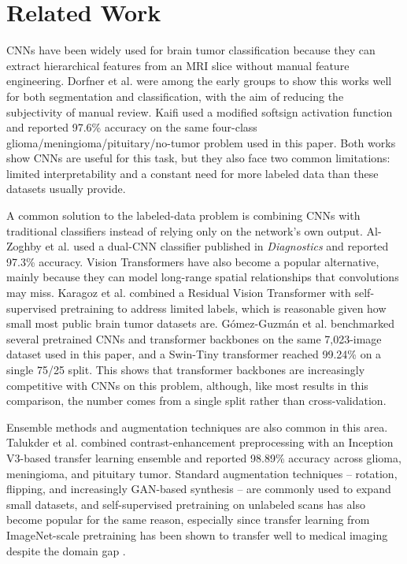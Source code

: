 \documentclass[conference]{IEEEtran}
\begin{document}
\section{Related Work}

CNNs have been widely used for brain tumor classification because they can extract hierarchical features from an MRI slice without manual feature engineering. Dorfner et al. \cite{r16} were among the early groups to show this works well for both segmentation and classification, with the aim of reducing the subjectivity of manual review. Kaifi \cite{r17} used a modified softsign activation function and reported 97.6\% accuracy on the same four-class glioma/meningioma/pituitary/no-tumor problem used in this paper. Both works show CNNs are useful for this task, but they also face two common limitations: limited interpretability and a constant need for more labeled data than these datasets usually provide.

A common solution to the labeled-data problem is combining CNNs with traditional classifiers instead of relying only on the network's own output. Al-Zoghby et al. \cite{r18} used a dual-CNN classifier published in \emph{Diagnostics} and reported 97.3\% accuracy. Vision Transformers \cite{dosovitskiy2021vit} have also become a popular alternative, mainly because they can model long-range spatial relationships that convolutions may miss. Karagoz et al. \cite{r19} combined a Residual Vision Transformer with self-supervised pretraining to address limited labels, which is reasonable given how small most public brain tumor datasets are. G\'omez-Guzm\'an et al. \cite{gomezguzman2025swin} benchmarked several pretrained CNNs and transformer backbones on the same 7,023-image dataset used in this paper, and a Swin-Tiny transformer reached 99.24\% on a single 75/25 split. This shows that transformer backbones are increasingly competitive with CNNs on this problem, although, like most results in this comparison, the number comes from a single split rather than cross-validation.

Ensemble methods and augmentation techniques are also common in this area. Talukder et al. \cite{r20} combined contrast-enhancement preprocessing with an Inception V3-based transfer learning ensemble and reported 98.89\% accuracy across glioma, meningioma, and pituitary tumor. Standard augmentation techniques -- rotation, flipping, and increasingly GAN-based synthesis \cite{goodfellow2014gan} -- are commonly used to expand small datasets, and self-supervised pretraining on unlabeled scans has also become popular for the same reason, especially since transfer learning from ImageNet-scale pretraining has been shown to transfer well to medical imaging despite the domain gap \cite{morid2021transfer}.
\end{document}
